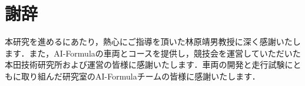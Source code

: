 \chapter*{謝辞}

本研究を進めるにあたり，熱心にご指導を頂いた林原靖男教授に深く感謝いたします．また，AI-Formulaの車両とコースを提供し，競技会を運営していただいた本田技術研究所および運営の皆様に感謝いたします．車両の開発と走行試験にともに取り組んだ研究室のAI-Formulaチームの皆様に感謝いたします．
